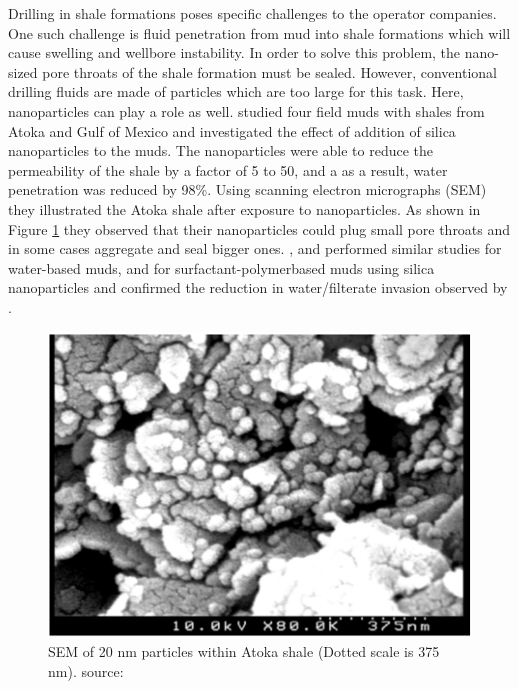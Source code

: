 Drilling in shale formations poses specific challenges to the operator companies. One such challenge is fluid penetration from mud into shale formations which will cause swelling and wellbore instability. In order to solve this problem, the nano-sized pore throats of the shale formation must be sealed. However, conventional drilling fluids are made of particles which are too large for this task. Here, nanoparticles can play a role as well. \citet{Sensoy2009} studied four field muds with shales from Atoka and Gulf of Mexico and investigated the effect of addition of silica nanoparticles to the muds. The nanoparticles were able to reduce the permeability of the shale by a factor of 5 to 50, and a as a result, water penetration was reduced by 98\%. Using scanning electron micrographs (SEM) they illustrated the Atoka shale after exposure to nanoparticles. As shown in Figure \ref{fig:npShale} they observed that their nanoparticles could plug small pore throats and in some cases aggregate and seal bigger ones. \citet{Cai2012}, \citet{Riley2012} and \citet{Young2013} performed similar studies for water-based muds, and \citet{Srivatsa2011} for surfactant-polymerbased muds using silica nanoparticles and confirmed the reduction in water/filterate invasion observed by \citet{Sensoy2009}.

\begin{figure}[h]
    \centering
    \includegraphics[width=\textwidth]{img/fig/npShale.png}
    \caption{SEM of 20 nm particles within Atoka shale (Dotted scale is 375 nm). source: \citet{Sensoy2009}}
    \label{fig:npShale}
\end{figure}

